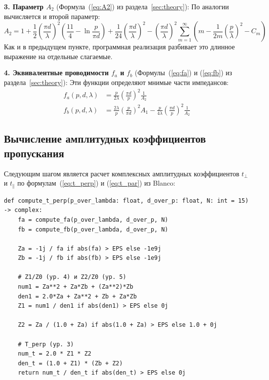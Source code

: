 \textbf{3. Параметр $A_2$} (Формула~(\ref{eq:A2}) из раздела~\ref{sec:theory}):
По аналогии вычисляется и второй параметр:
\begin{equation*}
A_2 = 1 + \frac{1}{2}\left(\frac{\pi d}{\lambda}\right)^2 \left( \frac{11}{4} - \ln\frac{p}{\pi d} \right) + \frac{1}{24}\left(\frac{\pi d}{\lambda}\right)^2 - \left(\frac{\pi d}{\lambda}\right)^2 \sum_{m=1}^\infty \left( m - \frac{1}{2m}\left(\frac{p}{\lambda}\right)^2 - C_m \right)
\end{equation*}
Как и в предыдущем пункте, программная реализация разбивает это длинное выражение на отдельные слагаемые.

\textbf{4. Эквивалентные проводимости $f_a$ и $f_b$} (Формулы~(\ref{eq:fa}) и (\ref{eq:fb}) из раздела~\ref{sec:theory}):
Эти функции определяют мнимые части импедансов:
\begin{align*}
f_a(p, d, \lambda) &= \frac{p}{2\lambda}\left(\frac{\pi d}{p}\right)^2 \frac{1}{A_2} \\
f_b(p, d, \lambda) &= \frac{2\lambda}{p}\left(\frac{p}{\pi d}\right)^2 A_1 - \frac{p}{4\lambda}\left(\frac{\pi d}{p}\right)^2 \frac{1}{A_2}
\end{align*}

\subsection{Вычисление амплитудных коэффициентов пропускания}

Следующим шагом является расчет комплексных амплитудных коэффициентов $t_\perp$ и $t_\parallel$ по формулам~(\ref{eq:t_perp}) и (\ref{eq:t_par}) из Blanco:

\begin{verbatim}
def compute_t_perp(p_over_lambda: float, d_over_p: float, N: int = 15) -> complex:
    fa = compute_fa(p_over_lambda, d_over_p, N)
    fb = compute_fb(p_over_lambda, d_over_p, N)
    
    Za = -1j / fa if abs(fa) > EPS else -1e9j
    Zb = -1j / fb if abs(fb) > EPS else -1e9j
    
    # Z1/Z0 (ур. 4) и Z2/Z0 (ур. 5)
    num1 = Za**2 + Za*Zb + (Za**2)*Zb
    den1 = 2.0*Za + Za**2 + Zb + Za*Zb
    Z1 = num1 / den1 if abs(den1) > EPS else 0j
    
    Z2 = Za / (1.0 + Za) if abs(1.0 + Za) > EPS else 1.0 + 0j
    
    # T_perp (ур. 3)
    num_t = 2.0 * Z1 * Z2
    den_t = (1.0 + Z1) * (Zb + Z2)
    return num_t / den_t if abs(den_t) > EPS else 0j
\end{verbatim}

